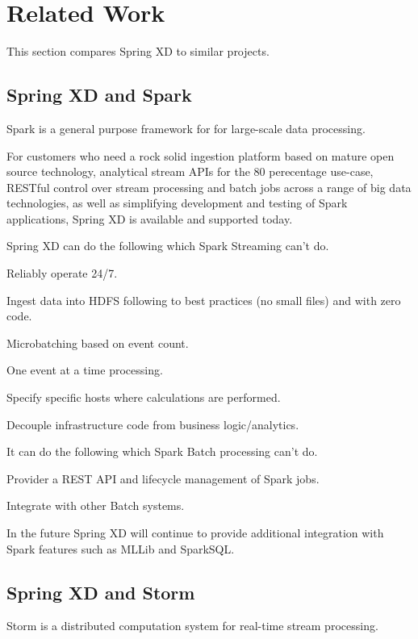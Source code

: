 \section{Related Work}
This section compares Spring XD to similar projects.

\subsection{Spring XD and Spark}
Spark is a general purpose framework for for large-scale data processing.

For customers who need a rock solid ingestion platform based on mature open source technology, analytical stream APIs for the 80 perecentage use-case, RESTful control over stream processing and batch jobs across a range of big data technologies, as well as simplifying development and testing of Spark applications, Spring XD is available and supported today.

Spring XD can do the following which Spark Streaming can't do.

\begin{itemize*}
\item Reliably operate 24/7.
\item Ingest data into HDFS following to best practices (no small files) and with zero code.
\item Microbatching based on event count.
\item One event at a time processing.
\item Specify specific hosts where calculations are performed.
\item Decouple infrastructure code from business logic/analytics.
\end{itemize*}

It can do the following which Spark Batch processing can't do.

\begin{itemize*}
\item Provider a REST API and lifecycle management of Spark jobs.
\item Integrate with other Batch systems.
\end{itemize*}

In the future Spring XD will continue to provide additional integration with Spark features such as MLLib and SparkSQL.

\subsection{Spring XD and Storm}
Storm is a distributed computation system for real-time stream processing.

